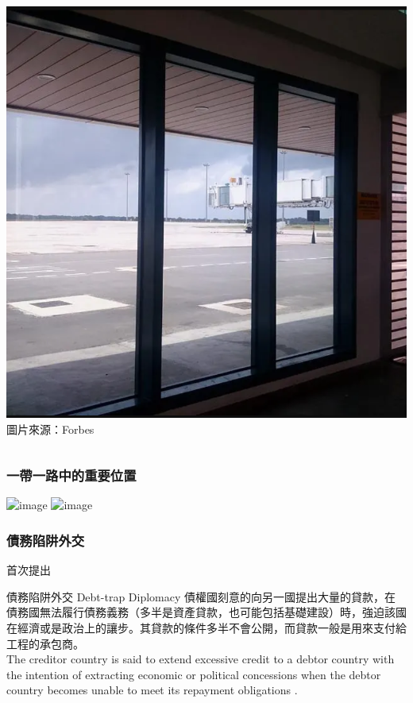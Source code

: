 \documentclass[mathserif]{beamer}
\begin{document}
\begin{frame}
\begin{columns}
\begin{column}{0.48\textwidth}
                    \includegraphics[width = \textwidth]{fig/empty_airport.png}
                    \footnotesize {圖片來源：Forbes}
            \end{column}
        \end{columns}
    \end{frame}

    \begin{frame}
        \frametitle{一帶一路中的重要位置}
        \includegraphics<1>[width = \textwidth]{fig/BRI.png}%
        \includegraphics<2>[width = \textwidth]{fig/BRI_2.png}%
    \end{frame}

    \begin{frame}
        \frametitle{債務陷阱外交}
            \citet{Chellaney_2017} 首次提出
            \begin{block}{債務陷阱外交 Debt-trap Diplomacy}
               債權國刻意的向另一國提出大量的貸款，在債務國無法履行債務義務（多半是資產貸款，也可能包括基礎建設）時，強迫該國在經濟或是政治上的讓步。其貸款的條件多半不會公開，而貸款一般是用來支付給工程的承包商。\\
               The creditor country is said to extend excessive credit to a debtor country with the intention of extracting economic or political concessions when the debtor country becomes unable to meet its repayment obligations .
            \end{block}
    \end{frame}
\end{document}
